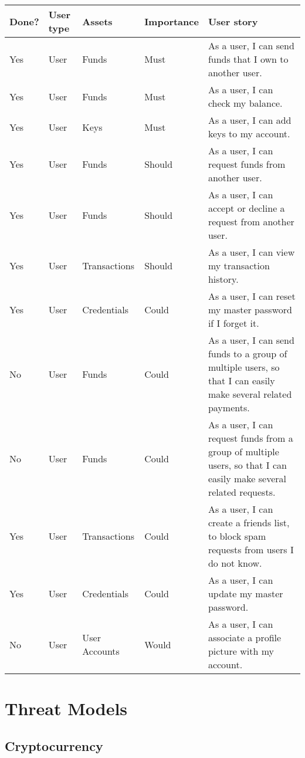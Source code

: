 \documentclass[12pt]{article}
\begin{document}
\begin{tabularx}{\linewidth}{|l|l|l|l|X|}
\hline
\textbf{Done?} & \textbf{User type} & \textbf{Assets} & \textbf{Importance} & \textbf{User story} \\
\hline
Yes & User & Funds & Must & As a user, I can send funds that I own to another user. \\
\hline
Yes & User & Funds & Must & As a user, I can check my balance. \\
\hline
Yes & User & Keys & Must & As a user, I can add keys to my account. \\
\hline
Yes & User & Funds & Should & As a user, I can request funds from another user. \\
\hline
Yes & User & Funds & Should & As a user, I can accept or decline a request from another user. \\
\hline
Yes & User & Transactions & Should & As a user, I can view my transaction history. \\
\hline
Yes & User & Credentials & Could & As a user, I can reset my master password if I forget it. \\
\hline
No & User & Funds & Could & As a user, I can send funds to a group of multiple users, so that I can easily make several related payments. \\
\hline
No & User & Funds & Could & As a user, I can request funds from a group of multiple users, so that I can easily make several related requests. \\
\hline
Yes & User & Transactions & Could & As a user, I can create a friends list, to block spam requests from users I do not know. \\
\hline
Yes & User & Credentials & Could & As a user, I can update my master password. \\
\hline
No & User & User Accounts & Would & As a user, I can associate a profile picture with my account. \\
\hline
\end{tabularx}

\section{Threat Models}

\subsection{Cryptocurrency}
\end{document}
